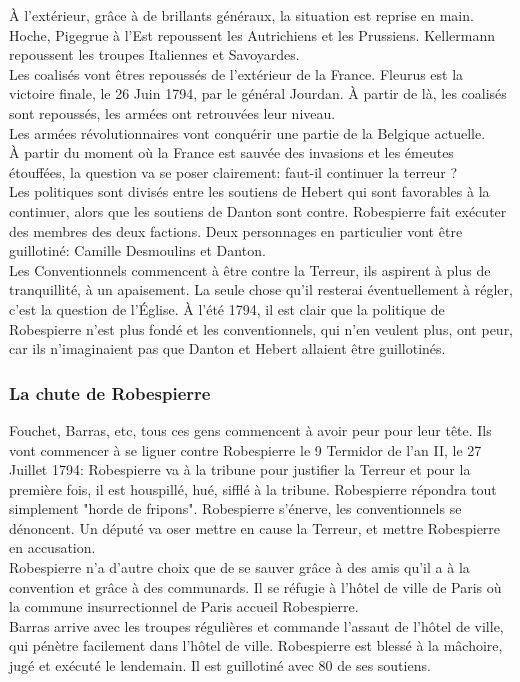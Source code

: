 \documentclass[10pt, a4paper, openany]{book}
\begin{document}
À l'extérieur, grâce à de brillants généraux, la situation est reprise en main. Hoche, Pigegrue à l'Est repoussent les Autrichiens et les Prussiens. Kellermann repoussent les troupes Italiennes et Savoyardes. \\
Les coalisés vont êtres repoussés de l'extérieur de la France. Fleurus est la victoire finale, le 26 Juin 1794, par le général Jourdan. À partir de là, les coalisés sont repoussés, les armées ont retrouvées leur niveau. \\
Les armées révolutionnaires vont conquérir une partie de la Belgique actuelle. \\
À partir du moment où la France est sauvée des invasions et les émeutes étouffées, la question va se poser clairement: faut-il continuer la terreur ? \\
Les politiques sont divisés entre les soutiens de Hebert qui sont favorables à la continuer, alors que les soutiens de Danton sont contre. Robespierre fait exécuter des membres des deux factions. Deux personnages en particulier vont être guillotiné: Camille Desmoulins et Danton. \\
Les Conventionnels commencent à être contre la Terreur, ils aspirent à plus de tranquillité, à un apaisement. La seule chose qu'il resterai éventuellement à régler, c'est la question de l'Église. À l'été 1794, il est clair que la politique de Robespierre n'est plus fondé et les conventionnels, qui n'en veulent plus, ont peur, car ils n'imaginaient pas que Danton et Hebert allaient être guillotinés. 

\subsubsection{La chute de Robespierre}

Fouchet, Barras, etc, tous ces gens commencent à avoir peur pour leur tête. Ils vont commencer à se liguer contre Robespierre le 9 Termidor de l'an II, le 27 Juillet 1794: Robespierre va à la tribune pour justifier la Terreur et pour la première fois, il est houspillé, hué, sifflé à la tribune. Robespierre répondra tout simplement "horde de fripons". Robespierre s'énerve, les conventionnels se dénoncent. Un député va oser mettre en cause la Terreur, et mettre Robespierre en accusation. \\
Robespierre n'a d'autre choix que de se sauver grâce à des amis qu'il a à la convention et grâce à des communards. Il se réfugie à l'hôtel de ville de Paris où la commune insurrectionnel de Paris accueil Robespierre. \\
Barras arrive avec les troupes régulières et commande l'assaut de l'hôtel de ville, qui pénètre facilement dans l'hôtel de ville. Robespierre est blessé à la mâchoire, jugé et exécuté le lendemain. Il est guillotiné avec 80 de ses soutiens. 
\end{document}
